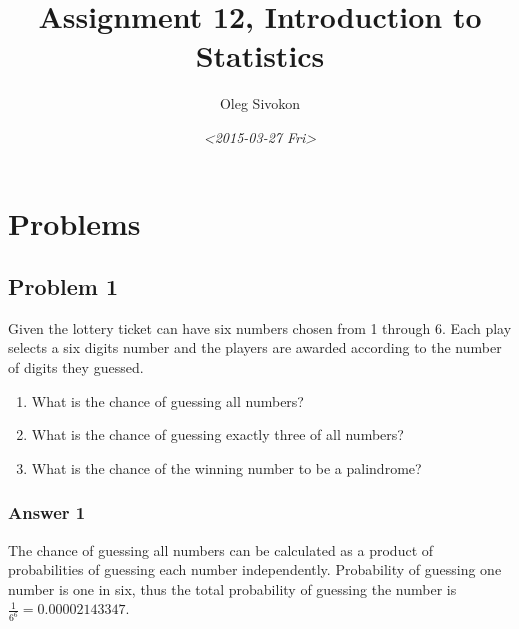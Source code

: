 \documentclass[11pt]{article}
\author{Oleg Sivokon}
\date{\textit{<2015-03-27 Fri>}}
\title{Assignment 12, Introduction to Statistics}
\begin{document}
\maketitle
\tableofcontents



\clearpage

\section{Problems}
\label{sec-1}

\subsection{Problem 1}
\label{sec-1-1}
Given the lottery ticket can have six numbers chosen from 1 through 6.
Each play selects a six digits number and the players are awarded according
to the number of digits they guessed.

\begin{enumerate}
\item What is the chance of guessing all numbers?
\item What is the chance of guessing exactly three of all numbers?
\item What is the chance of the winning number to be a palindrome?
\end{enumerate}

\subsubsection{Answer 1}
\label{sec-1-1-1}
The chance of guessing all numbers can be calculated as a product of
probabilities of guessing each number independently. Probability of
guessing one number is one in six, thus the total probability of
guessing the number is $\frac{1}{6^6} = 0.00002143347$.
\end{document}
